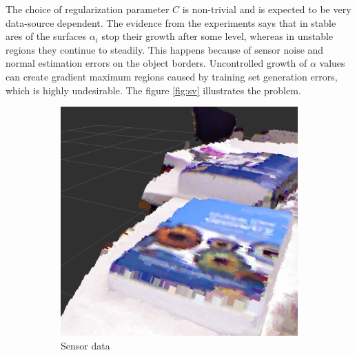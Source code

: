 The choice of regularization parameter $C$ is non-trivial and is expected to be very data-source dependent. The evidence from the experiments says that in stable ares of the surfaces $\alpha_i$ stop their growth after some level, whereas in unstable regions they continue to steadily. This happens because of sensor noise and normal estimation errors on the object borders. Uncontrolled growth of $\alpha$ values can create gradient maximum regions caused by training set generation errors, which is highly undesirable. The figure \ref{fig:sv} illustrates the problem.
\begin{figure}
\centering
        \begin{subfigure}[b]{0.3\textwidth}
                \includegraphics[width=\textwidth]{two_books.png}
                \caption{Sensor data}
                \label{fig:2books}
        \end{subfigure}%
        ~ %
        \begin{subfigure}[b]{0.3\textwidth}

\end{subfigure}
\end{figure}
